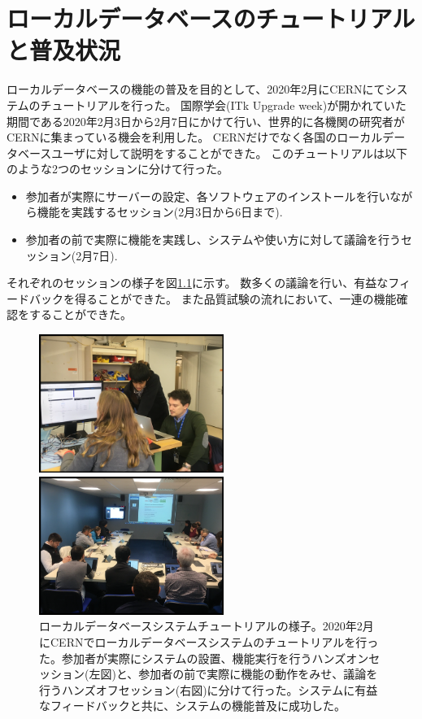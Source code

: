 \chapter{ローカルデータベースのチュートリアルと普及状況} \label{cap:appA}

ローカルデータベースの機能の普及を目的として、2020年2月にCERNにてシステムのチュートリアルを行った。
国際学会(ITk Upgrade week)が開かれていた期間である2020年2月3日から2月7日にかけて行い、世界的に各機関の研究者がCERNに集まっている機会を利用した。
CERNだけでなく各国のローカルデータベースユーザに対して説明をすることができた。
このチュートリアルは以下のような2つのセッションに分けて行った。

\begin{itemize}
  \item 参加者が実際にサーバーの設定、各ソフトウェアのインストールを行いながら機能を実践するセッション(2月3日から6日まで).
  \item 参加者の前で実際に機能を実践し、システムや使い方に対して議論を行うセッション(2月7日).
\end{itemize}

それぞれのセッションの様子を図\ref{Tutorial_picture}に示す。
数多くの議論を行い、有益なフィードバックを得ることができた。
また品質試験の流れにおいて、一連の機能確認をすることができた。

\begin{figure}[bpt]
  \begin{center}
  \begin{minipage}{0.4\hsize}
    \includegraphics[width=6cm]{./hands_on.png}
  \end{minipage}
  \begin{minipage}{0.4\hsize}
    \includegraphics[width=6cm]{./hands_off.png}
  \end{minipage}
  \caption[ローカルデータベースシステムチュートリアルの様子]{ローカルデータベースシステムチュートリアルの様子。2020年2月にCERNでローカルデータベースシステムのチュートリアルを行った。参加者が実際にシステムの設置、機能実行を行うハンズオンセッション(左図)と、参加者の前で実際に機能の動作をみせ、議論を行うハンズオフセッション(右図)に分けて行った。システムに有益なフィードバックと共に、システムの機能普及に成功した。}
  \label{Tutorial_picture}
  \end{center}
\end{figure}

